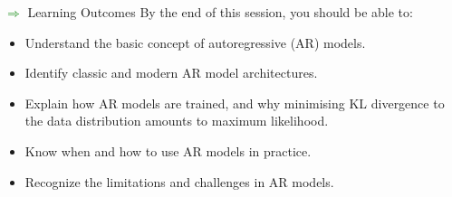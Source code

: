 \begin{frame}[allowframebreaks]{\textcolor{green}{$\Rightarrow$} Learning Outcomes}
    By the end of this session, you should be able to:
    \begin{itemize}
        \item Understand the basic concept of autoregressive (AR) models.
        \item Identify classic and modern AR model architectures.
        \item Explain how AR models are trained, and why minimising KL divergence to the data distribution amounts to maximum likelihood.
        \item Know when and how to use AR models in practice.
        \item Recognize the limitations and challenges in AR models.
    \end{itemize}
\end{frame}